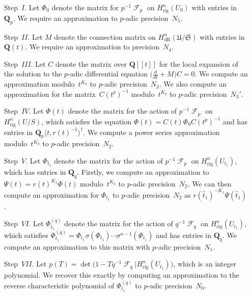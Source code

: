 \documentclass[a4paper,11pt]{article}
\numberwithin{equation}{section}
\DeclareMathOperator{\Frob}{\mathcal{F}} %
\providecommand{\HdR}{H_{\text{dR}}}    %
\providecommand{\Hrig}{H_{\text{rig}}}  %
\theoremstyle{definition}
\begin{document}
\begin{enumerate}
\item[Step~$I$.]
Let $\Phi_0$ denote the matrix for $p^{-1} \Frob_p$ on 
$\Hrig^{n}(U_0)$ with entries in~$\mathbf{Q}_p$.  
We require an approximation to $p$-adic precision~$N_5$.
\item[Step~$II$.]
Let $M$ denote the connection matrix on $\HdR^{n}(\mathfrak{U}/\mathfrak{S})$ 
with entries in~$\mathbf{Q}(t)$.  We require an approximation 
to precision~$N_4$.
\item[Step~$III$.]
Let $C$ denote the matrix over $\mathbf{Q}[[t]]$ for the local 
expansion of the solution to the $p$-adic differential equation 
$\bigl(\tfrac{d}{dt} + M\bigr) C = 0$.  We compute an approximation 
modulo~$t^{K_2}$ to $p$-adic precision~$N_3$.  We also compute an 
approximation for the matrix~$C(t^p)^{-1}$ modulo~$t^{K_2}$ to $p$-adic 
precision~$N_3'$.
\item[Step~$IV$.]
Let $\Phi(t)$ denote the matrix for the action of $p^{-1} \Frob_p$ on 
$\Hrig^{n}(U/S)$, which satisfies the equation 
$\Phi(t) = C(t) \Phi_0 C(t^p)^{-1}$ and has entries in 
$\mathbf{Q}_p\langle t,r(t)^{-1}\rangle^{\dagger}$.  We compute 
a power series approximation modulo~$t^{K_2}$ to $p$-adic precision~$N_2$.
\item[Step~$V$.]
Let $\Phi_{t_1}$ denote the matrix for the action of $p^{-1} \Frob_p$ 
on $\Hrig^{n}(U_{t_1})$, which has entries in $\mathbf{Q}_q$. 
Firstly, we compute an approximation to $\Psi(t) = r(t)^{K_1} \Phi(t)$ 
modulo~$t^{K_2}$ to $p$-adic precision~$N_2$.  We can then compute 
an approximation for $\Phi_{t_1}$ to $p$-adic precision~$N_2$ 
as $r(\hat{t}_1)^{-K_1} \Psi(\hat{t}_1)$.
\item[Step~$VI$.]
Let $\Phi_{t_1}^{(q)}$ denote the matrix for the action of $q^{-1} \Frob_q$ on 
$\Hrig^{n}(U_{t_1})$, which satisfies 
$\Phi_{t_1}^{(q)} = \Phi_{t_1} \sigma(\Phi_{t_1}) \dotsm \sigma^{a-1}(\Phi_{t_1})$ 
and has entries in $\mathbf{Q}_q$.  We compute an approximation to this 
matrix with $p$-adic precision~$N_1$.
\item[Step~$VII$.]
Let $p(T) = \det\bigl(1 - T q^{-1} \Frob_q | \Hrig^n(U_{t_1})\bigr)$, 
which is an integer polynomial.  We recover this exactly 
by computing an approximation to the reverse characteristic polynomial 
of $\Phi_{t_1}^{(q)}$ to $p$-adic precision~$N_0$.
\end{enumerate}

\end{document}
